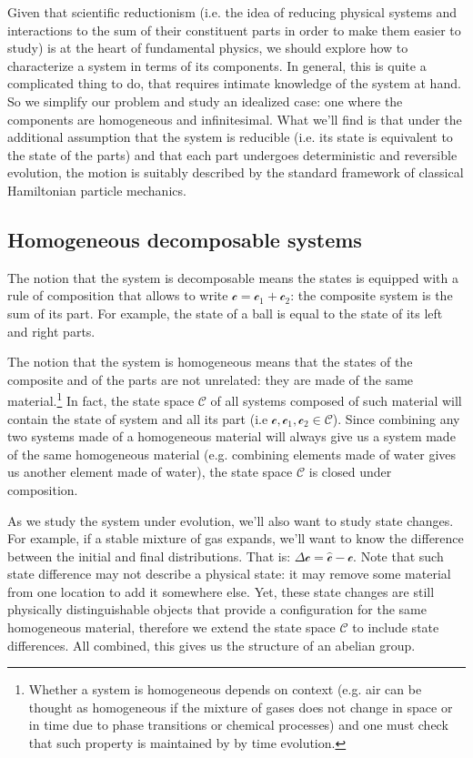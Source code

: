 \documentclass[aps,pra,10pt,twocolumn,floatfix,nofootinbib]{revtex4-1}
\theoremstyle{definition}
\begin{document}


Given that scientific reductionism (i.e. the idea of reducing physical systems and interactions to the sum of their constituent parts in order to make them easier to study) is at the heart of fundamental physics, we should explore how to characterize a system in terms of its components. In general, this is quite a complicated thing to do, that requires intimate knowledge of the system at hand. So we simplify our problem and study an idealized case: one where the components are homogeneous and infinitesimal. What we'll find is that under the additional assumption that the system is reducible (i.e. its state is equivalent to the state of the parts) and that each part undergoes deterministic and reversible evolution, the motion is suitably described by the standard framework of classical Hamiltonian particle mechanics.

\subsection{Homogeneous decomposable systems}
The notion that the system is decomposable means the states is equipped with a rule of composition that allows to write $\mathcal{c}=\mathcal{c}_1+\mathcal{c}_2$: the composite system is the sum of its part. For example, the state of a ball is equal to the state of its left and right parts.

The notion that the system is homogeneous means that the states of the composite and of the parts are not unrelated: they are made of the same material.\footnote{Whether a system is homogeneous depends on context (e.g. air can be thought as homogeneous if the mixture of gases does not change in space or in time due to phase transitions or chemical processes) and one must check that such property is maintained by by time evolution.} In fact, the state space $\mathcal{C}$ of all systems composed of such material will contain the state of system and all its part (i.e $\mathcal{c}, \mathcal{c}_1, \mathcal{c}_2 \in \mathcal{C}$). Since combining any two systems made of a homogeneous material will always give us a system made of the same homogeneous material (e.g. combining elements made of water gives us another element made of water), the state space $\mathcal{C}$ is closed under composition.

As we study the system under evolution, we'll also want to study state changes. For example, if a stable mixture of gas expands, we'll want to know the difference between the initial and final distributions. That is: $\Delta\mathcal{c}=\hat{\mathcal{c}}-\mathcal{c}$. Note that such state difference may not describe a physical state: it may remove some material from one location to add it somewhere else. Yet, these state changes are still physically distinguishable objects that provide a configuration for the same homogeneous material, therefore we extend the state space $\mathcal{C}$ to include state differences. All combined, this gives us the structure of an abelian group.
\end{document}
